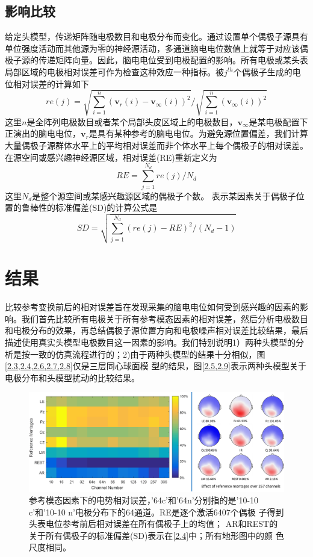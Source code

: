 \subsection{影响比较}
给定头模型，传递矩阵随电极数目和电极分布而变化。通过设置单个偶极子源具有单位强度活动而其他源为零的神经源活动，多通道脑电电位数值上就等于对应该偶极子源的传递矩阵向量。因此，脑电电位受到电极配置的影响。所有电极或某头表局部区域的电极相对误差可作为检查这种效应一种指标。被$j^{th}$个偶极子生成的电位相对误差的计算如下
\begin{equation*}
re(j)=\sqrt{\sum_{i=1}^n(\mathbf{v}_r(i)-\mathbf{v}_{\infty}(i))^2}/\sqrt{\sum_{i=1}^n(\mathbf{v}_{\infty}(i))^2}
\end{equation*}
这里$n$是全阵列电极数目或者某个局部头皮区域上的电极数目，$\mathbf{v}_{\infty}$是某电极配置下正演出的脑电电位，$\mathbf{v}_r$是具有某种参考的脑电电位。为避免源位置偏差，我们计算大量偶极子源群体水平上的平均相对误差而非个体水平上每个偶极子的相对误差。在源空间或感兴趣神经源区域，相对误差(RE)重新定义为
\begin{equation*}
RE=\sum_{j=1}^{N_d}re(j)/{N_d}
\end{equation*}
这里$N_d$是整个源空间或某感兴趣源区域的偶极子个数。 表示某因素关于偶极子位置的鲁棒性的标准偏差(SD)的计算公式是
\begin{equation*}
SD=\sqrt{\sum_{j=1}^{N_d}(re(j)-RE)^2/(N_d-1)}
\end{equation*}

\section{结果}
比较参考变换前后的相对误差旨在发现采集的脑电电位如何受到感兴趣的因素的影响。我们首先比较所有电极关于所有参考模态因素的相对误差，然后分析电极数目和电极分布的效果，再总结偶极子源位置方向和电极噪声相对误差比较结果，最后描述使用真实头模型电极数目这一因素的影响。我们特别说明1）两种头模型的分析是按一致的仿真流程进行的；2)由于两种头模型的结果十分相似，图\cref{2.3,2.4,2.6,2.7,2.8}仅是三层同心球面模
型的结果，图\cref{2.5,2.9}表示两种头模型关于电极分布和头模型扰动的比较结果。
\begin{figure}[h!]
	\centering
	\includegraphics[width=15cm]{pic/JNE/figure3.png}
	\caption{参考模态因素下的电势相对误差，'64c'和'64n'分别指的是'10-10 c'和'10-10 n'电极分布下的64通道。RE是逐个激活6407个偶极
	子得到头表电位参考前后相对误差在所有偶极子上的均值； AR和REST的关于所有偶极子的标准偏差(SD)表示在\ref{2.4}中；所有地形图中的颜
	色尺度相同。}
	\label{2.3}
\end{figure}
